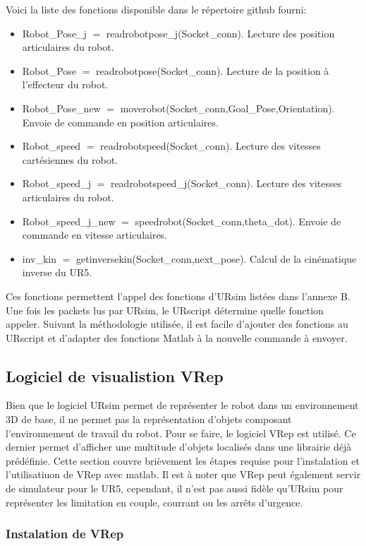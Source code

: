\documentclass[root.tex]{subfiles}
\begin{document}
Voici la liste des fonctions disponible dans le répertoire github fourni: 
\begin{itemize}
\item Robot\_Pose\_j $=$ readrobotpose\_j(Socket\_conn).	Lecture des position articulaires du robot.
\item Robot\_Pose $=$ readrobotpose(Socket\_conn).			Lecture de la position à l'effecteur du robot.
\item Robot\_Pose\_new $=$ moverobot(Socket\_conn,Goal\_Pose,Orientation).	Envoie de commande en position articulaires.
\item Robot\_speed $=$ readrobotspeed(Socket\_conn).		Lecture des vitesses cartésiennes du robot.
\item Robot\_speed\_j $=$ readrobotspeed\_j(Socket\_conn).	Lecture des vitesses articulaires du robot.
\item Robot\_speed\_j\_new $=$ speedrobot(Socket\_conn,theta\_dot). Envoie de commande en vitesse articulaires.
\item inv\_kin $=$ getinversekin(Socket\_conn,next\_pose).	Calcul de la cinématique inverse du UR5.
\end{itemize}



Ces fonctions permettent l'appel des fonctions d'URsim listées dans l'annexe B.
Une fois les packets lus par URsim, le URscript détermine quelle fonction appeler.
Suivant la méthodologie utilisée, il est facile d'ajouter des fonctions au URscript et d'adapter des fonctions Matlab à la nouvelle commande à envoyer.

\subsection{Logiciel de visualistion VRep}

Bien que le logiciel URsim permet de représenter le robot dans un environnement 3D de base, il ne permet pas la représentation d'objets composant l'environnement de travail du robot.
Pour se faire, le logiciel VRep est utilisé.
Ce dernier permet d'afficher une multitude d'objets localisés dans une librairie déjà prédéfinie.
Cette section couvre brièvement les étapes requise pour l'instalation et l'utilisatiuon de VRep avec matlab.
Il est à noter que VRep peut également servir de simulateur pour le UR5, cependant, il n'est pas aussi fidèle qu'URsim pour représenter les limitation en couple, courrant ou les arrêts d'urgence.

\subsubsection{Instalation de VRep}
\end{document}
